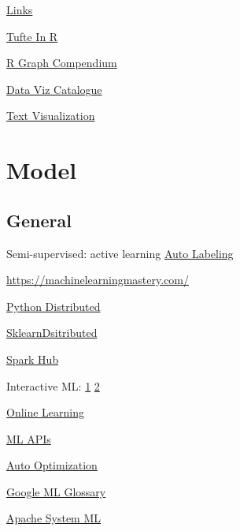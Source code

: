 \documentclass[]{book}
\begin{document}
\href{http://www.thehackerwithin.org/swinburne/links.html}{Links}

\href{http://motioninsocial.com/tufte/}{Tufte In R}

\href{http://shinyapps.org/apps/RGraphCompendium/index.php}{R Graph
Compendium}

\href{http://www.datavizcatalogue.com/index.html}{Data Viz Catalogue}

\href{http://textvis.lnu.se/}{Text Visualization}

\section{Model}\label{model-2}

\subsection{General}\label{general-7}

Semi-supervised: active learning \textbar{}
\href{https://blog.fastforwardlabs.com/2018/09/28/snorkel-rapid-training-data-creation-with-weak-supervision.html}{Auto
Labeling}

\url{https://machinelearningmastery.com/}

\href{https://speakerdeck.com/seanoc/a-tour-of-large-scale-data-analysis-tools-in-python}{Python
Distributed}

\href{https://alexperrier.github.io/jekyll/update/2016/03/16/out-of-core-scikit-boston-meetup.html\#/}{SklearnDsitributed}

\href{https://sparkhub.databricks.com/}{Spark Hub}

Interactive ML:
\href{https://channel9.msdn.com/Events/useR-international-R-User-conference/useR2016/Interactive-Naive-Bayes-using-Shiny-Text-Retrieval-Classification-Quantification}{1}
\textbar{}
\href{https://nuit-blanche.blogspot.com/2017/02/saturday-morning-videos-interactive.html}{2}

\href{http://scikit-learn.org/stable/modules/generated/sklearn.linear_model.PassiveAggressiveRegressor.html}{Online
Learning}

\href{http://www.kdnuggets.com/2015/12/machine-learning-data-science-apis.html}{ML
APIs}

\href{https://sigopt.com/}{Auto Optimization}

\href{https://developers.google.com/machine-learning/glossary/}{Google
ML Glossary}

\href{https://systemml.apache.org}{Apache System ML}
\end{document}
